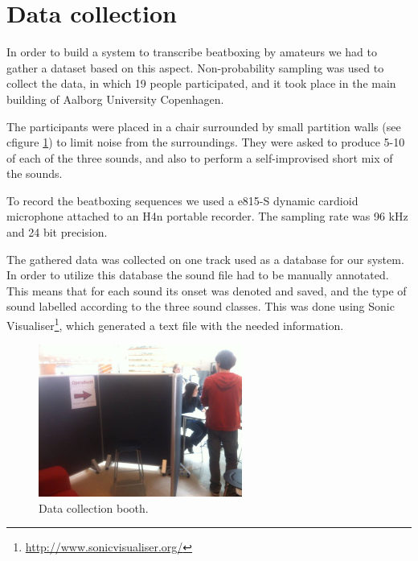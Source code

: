 \section{Data collection}
\label{sec:data-collecting}
In order to build a system to transcribe beatboxing by amateurs we had to gather a dataset based on this aspect. 
Non-probability sampling was used to collect the data, in which 19 people participated, and it took place in the main building of Aalborg University Copenhagen. 

The participants were placed in a chair surrounded by small partition walls (see cfigure \ref{data-collection-pic}) to limit noise from the surroundings. They were asked to produce 5-10 of each of the three sounds, and also to perform a self-improvised short mix of the sounds.

To record the beatboxing sequences we used a e815-S dynamic cardioid microphone attached to an H4n portable recorder. The sampling rate was 96 kHz and 24 bit precision.

The gathered data was collected on one track used as a database for our system. In order to utilize this database the sound file had to be manually annotated. This means that for each sound its onset was denoted and saved, and the type of sound labelled according to the three sound classes. This was done using Sonic Visualiser\footnote{\url{http://www.sonicvisualiser.org/}}, which generated a text file with the needed information.

\begin{figure}[h]
	\begin{center}
		\includegraphics[height=5cm]{fig/dataset_collection.JPG}
		\caption{Data collection booth.}
		\label{data-collection-pic}
	\end{center}
\end{figure}